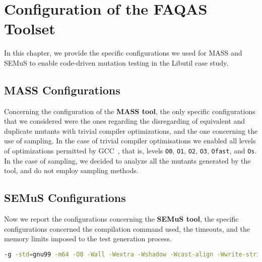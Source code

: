 
\chapter{Configuration of the FAQAS Toolset}



In this chapter, we provide the specific configurations we used for MASS and SEMuS to enable code-driven mutation testing in the Libutil case study.

\section{MASS Configurations}


Concerning the configuration of the \textbf{MASS tool}, the only specific configurations that we considered were the ones regarding the disregarding of equivalent and duplicate mutants with trivial compiler optimizations, and the one concerning the use of sampling.
In the case of trivial compiler optimisations we enabled all levels of optimizations permitted by GCC~\cite{GCCopt}, that is, levels \texttt{O0}, \texttt{O1}, \texttt{O2}, \texttt{O3}, \texttt{Ofast}, and \texttt{Os}. 
In the case of sampling, we decided to analyze all the mutants generated by the tool, and do not employ sampling methods. 

\section{SEMuS Configurations}

Now we report the configurations concerning the \textbf{SEMuS tool}, the specific configurations concerned the compilation command used, the timeouts, and the memory limits imposed to the test generation process.

\begin{lstlisting}[language=bash, label=libutil_com_cmd, caption=Compilation command for a single Libutil source used in SEMuS.]
-g -std=gnu99 -m64 -O0 -Wall -Wextra -Wshadow -Wcast-align -Wwrite-strings -Wno-unused-parameter -I$repo_root_dir/src -I$repo_root_dir/src/gosh -I$repo_root_dir/src/zip -I$repo_root_dir/src/watchdog  -I$repo_root_dir/build/src/watchdog -I$repo_root_dir/build/src -I$repo_root_dir/include -I$repo_root_dir/build/include -I$repo_root_dir/include/gs -I$repo_root_dir/build/include/gs -I$repo_root_dir/include/deprecated -I$repo_root_dir/build/include/deprecated -I$repo_root_dir/include/deprecated/gs/gosh -I$repo_root_dir/build/include/deprecated/gs/gosh -I$repo_root_dir/include -o $out_file $in_file
\end{lstlisting}

